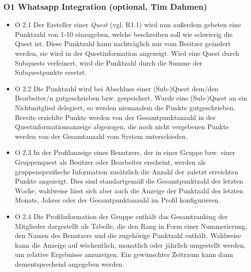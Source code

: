 \documentclass{article}
\begin{document}
\subsubsection{O1 Whatsapp  Integration (optional, Tim Dahmen)}
      \begin{itemize}
	\item{O 2.1} Der Ersteller einer \textit{Quest} (vgl. R1.1) wird nun außerdem gebeten eine Punktzahl von 1-10 einzugeben, welche beschreiben soll wie schwierig die Quest ist. 			Diese Punktzahl kann nachträglich nur vom Besitzer geändert werden, sie wird in der Questinformation angezeigt. Wird eine Quest durch Subquests verfeinert, wird die Punktzahl 			durch die Summe der Subquestpunkte ersetzt.

	\item{O 2.2} Die Punktzahl wird bei Abschluss einer (Sub-)Quest dem/den Bearbeiter/n gutgeschrieben bzw. gespeichert. Wurde eine (Sub-)Quest an ein Nichtmitglied delegiert, so 		werden niemandem die Punkte gutgeschrieben. \\
  	Bereits erziehlte Punkte werden von der Gesamtpunktanzahl in der Questinformationsanzeige abgezogen, die noch nicht vergebenen Punkte werden von der Gesamtanzahl vom System 			unterschieden.

        \item{O 2.3} In der Profilanzeige eines Benutzers, der in einer Gruppe bzw. einer Gruppenquest als Besitzer oder Bearbeiter erscheint, werden als gruppenspezifische Information 		zusätzlich die Anzahl der zuletzt erreichten Punkte angezeigt. Dies sind standartgemäß die Gesamtpunktzahl der letzten Woche, wahlweise lässt sich aber auch die Anzeige der Punktzahl 		des letzten Monats, Jahres oder der Gesamtpunktanzahl im Profil konfigurieren.
    		

        \item{O 2.4} Die Profilinformation der Gruppe enthält das Gesamtranking der Mitglieder dargestellt als  Tabelle, die den Rang in Form einer Nummerierung, den Namen des Benutzers und 		die zugehörige Punktzahl enthält.
        Wahlweise kann die Anzeige auf wöchentlich, monatlich oder jährlich umgestellt werden, um relative Ergebnisse anzuzeigen. Ein gewünschter Zeitraum kann dann dementsprechend angegeben 		werden.


\end{itemize}
\end{document}
